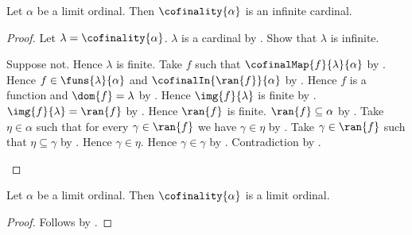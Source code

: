 \begin{theorem}\label{cofinality_of_limit_is_infinite_cardinal}
    Let $\alpha$ be a limit ordinal.
    Then $\cofinality{\alpha}$ is an infinite cardinal.
\end{theorem}
\begin{proof}
    Let $\lambda=\cofinality{\alpha}$.
    $\lambda$ is a cardinal by .
    Show that $\lambda$ is infinite.
    \begin{subproof}
        Suppose not.
        Hence $\lambda$ is finite.
        Take $f$ such that $\cofinalMap{f}{\lambda}{\alpha}$
            by .
        Hence $f\in\funs{\lambda}{\alpha}$ and
            $\cofinalIn{\ran{f}}{\alpha}$ by .
        Hence $f$ is a function and $\dom{f}=\lambda$
            by .
        Hence $\img{f}{\lambda}$ is finite
            by .
        $\img{f}{\lambda}=\ran{f}$ by .
        Hence $\ran{f}$ is finite.
        $\ran{f}\subseteq\alpha$ by .
        Take $\eta\in\alpha$ such that
            for every $\gamma\in\ran{f}$ we have $\gamma\in\eta$
            by .
        Take $\gamma\in\ran{f}$ such that $\eta\subseteq\gamma$
            by .
        Hence $\gamma\in\eta$.
        Hence $\gamma\in\gamma$ by .
        Contradiction by .
    \end{subproof}
\end{proof}

\begin{corollary}\label{cofinality_of_limit_is_limit_ordinal}
    Let $\alpha$ be a limit ordinal.
    Then $\cofinality{\alpha}$ is a limit ordinal.
\end{corollary}
\begin{proof}
    Follows by
        .
\end{proof}

